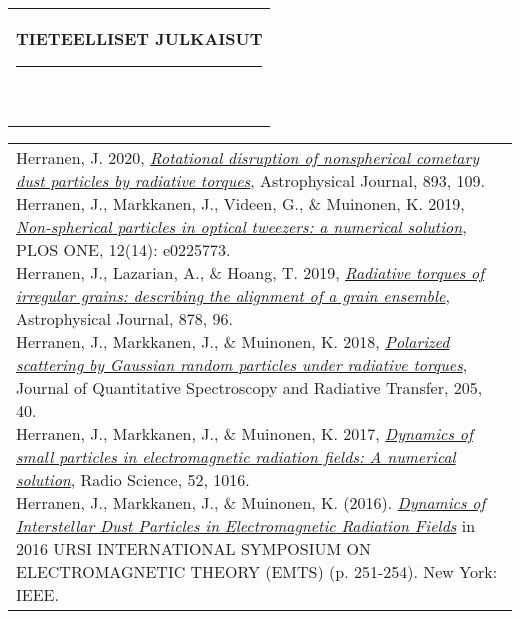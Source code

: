 \documentclass[10pt,A4]{article}
\newcommand{\mpwidth}{\linewidth-\fboxsep-\fboxsep}
\newcommand{\cvtext}[1] {
	\begin{tabular*}{1\mpwidth}{p{0.98\mpwidth}}
		\parbox{1\mpwidth}{#1}
	\end{tabular*}
}
\newcommand{\cvsection}[1] {
	\vspace{14pt}
	\cvtext{
		\textbf{\LARGE{\textcolor{darkcol}{\uppercase{#1}}}}\\[-4pt]
		\textcolor{maincol}{ \rule{0.1\textwidth}{2pt} } \\
	}
}
\begin{document}
\begin{paracol}{2}
\begin{rightcolumn}
			\newpage
			\cvsection{Tieteelliset julkaisut}
			
			\cvtext{
				
				Herranen, J. 2020, \emph{\href{https://doi.org/10.3847/1538-4357/ab8009}{Rotational disruption of nonspherical cometary dust particles by radiative torques}}, Astrophysical Journal, 893, 109. \\[-5pt]
				
				Herranen, J., Markkanen, J., Videen, G., \& Muinonen, K. 2019, \emph{\href{https://doi.org/10.1371/journal.pone.0225773}{Non-spherical particles in optical tweezers: a numerical solution}}, PLOS ONE, 12(14): e0225773.\\[-5pt]
				
				Herranen, J., Lazarian, A., \& Hoang, T. 2019, \emph{\href{https://doi.org/10.3847\%2F1538-4357\%2Fab1eb3}{Radiative torques of irregular grains: describing the alignment of a grain ensemble}}, Astrophysical Journal, 878, 96.\\[-5pt]
				
				Herranen, J., Markkanen, J., \& Muinonen, K. 2018, \emph{\href{https://doi.org/10.1016/j.jqsrt.2017.09.033}{Polarized scattering by Gaussian random particles under radiative torques}}, Journal of Quantitative Spectroscopy and Radiative Transfer, 205, 40.\\[-5pt]
				
				Herranen, J., Markkanen, J., \& Muinonen, K. 2017, \emph{\href{https://doi.org/10.1002/2017RS006333}{Dynamics of small particles in electromagnetic radiation fields: A numerical solution}}, Radio Science, 52, 1016.\\[-5pt]
				
				Herranen, J., Markkanen, J., \& Muinonen, K. (2016). \emph{\href{https://doi.org/10.1109/URSI-EMTS.2016.7571366}{Dynamics of Interstellar Dust Particles in Electromagnetic Radiation Fields}} in 2016 URSI INTERNATIONAL SYMPOSIUM ON ELECTROMAGNETIC THEORY (EMTS) (p. 251-254). New York: IEEE.
				
			}
		
			\mbox{}
			\vfill
			\mbox{}
			\vfill
			\mbox{}
			\vfill
			\mbox{}
		\end{rightcolumn}
	\end{paracol}
\end{document}
